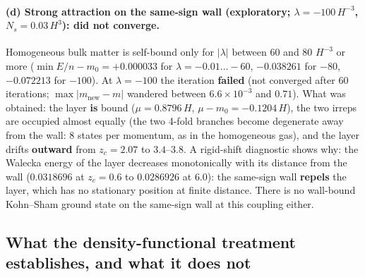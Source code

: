 \paragraph{(d) Strong attraction on the same-sign wall (exploratory; $\lambda=-100\,H^{-3}$,
$N_s=0.03\,H^3$): did not converge.} Homogeneous bulk matter is self-bound only for $|\lambda|$ between 60 and
80 $H^{-3}$ or more ($\min E/n-m_0=+0.000033$ for $\lambda=-0.01\dots-60$, $-0.038261$ for $-80$, $-0.072213$
for $-100$). At $\lambda=-100$ the iteration \textbf{failed} (not converged after 60 iterations;
$\max|m_{\mathrm{new}}-m|$ wandered between $6.6\times10^{-3}$ and $0.71$). What was obtained: the layer
\textbf{is} bound ($\mu=0.8796\,H$, $\mu-m_0=-0.1204\,H$), the two irreps are occupied almost equally (the two
4-fold branches become degenerate away from the wall: 8 states per momentum, as in the homogeneous gas),
and the layer drifts \textbf{outward} from $z_c=2.07$ to $3.4$--$3.8$. A rigid-shift diagnostic shows why:
the Walecka energy of the layer decreases monotonically with its distance from the wall ($0.0318696$ at
$z_c=0.6$ to $0.0286926$ at $6.0$): the same-sign wall \textbf{repels} the layer, which has no stationary
position at finite distance. There is no wall-bound Kohn--Sham ground state on the same-sign wall at this
coupling either.

\subsection{What the density-functional treatment establishes, and what it does not}
\label{sec:8.7}

